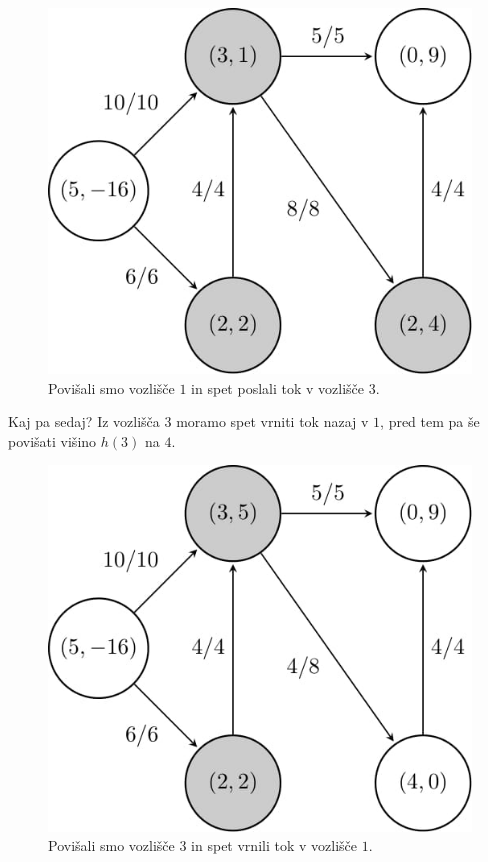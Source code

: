 \documentclass[mat1]{fmfdelo}
\begin{document}
\begin{figure}[H]
  \centering
  \includegraphics[scale=.358]{images/graf2-8/graf2-8-1.jpg}
  \caption{Povišali smo vozlišče $1$ in spet poslali tok v vozlišče $3$.}
  \label{fig:slika8}
\end{figure}

Kaj pa sedaj? Iz vozlišča $3$ moramo spet vrniti tok nazaj v $1$, pred tem pa še povišati višino $h(3)$ na $4$.

\begin{figure}[H]
  \centering
  \includegraphics[scale=.358]{images/graf2-9/graf2-9-1.jpg}
  \caption{Povišali smo vozlišče $3$ in spet vrnili tok v vozlišče $1$.}
  \label{fig:slika9}
\end{figure}
\end{document}
